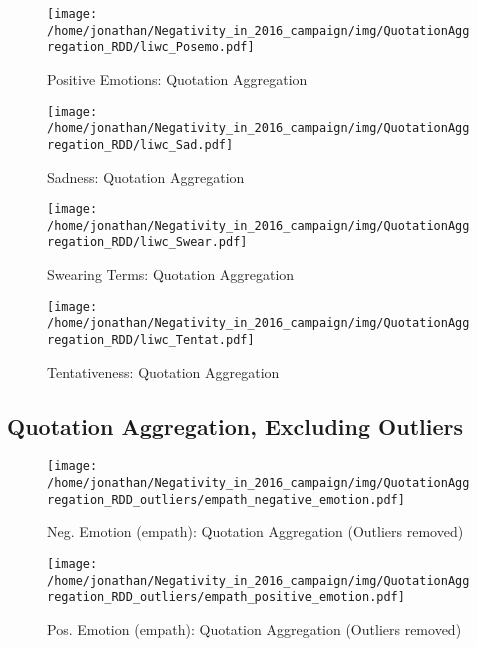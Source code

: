\begin{figure}[h]\centering
	\texttt{[image: /home/jonathan/Negativity\_in\_2016\_campaign/img/QuotationAggregation\_RDD/liwc\_Posemo.pdf]}
	\caption{Positive Emotions: Quotation Aggregation}
	\label{fig: qa_Positive Emotions}
\end{figure}

\begin{figure}[h]\centering
	\texttt{[image: /home/jonathan/Negativity\_in\_2016\_campaign/img/QuotationAggregation\_RDD/liwc\_Sad.pdf]}
	\caption{Sadness: Quotation Aggregation}
	\label{fig: qa_Sadness}
\end{figure}

\begin{figure}[h]\centering
	\texttt{[image: /home/jonathan/Negativity\_in\_2016\_campaign/img/QuotationAggregation\_RDD/liwc\_Swear.pdf]}
	\caption{Swearing Terms: Quotation Aggregation}
	\label{fig: qa_Swearing Terms}
\end{figure}

\begin{figure}[h]\centering
	\texttt{[image: /home/jonathan/Negativity\_in\_2016\_campaign/img/QuotationAggregation\_RDD/liwc\_Tentat.pdf]}
	\caption{Tentativeness: Quotation Aggregation}
	\label{fig: qa_Tentativeness}
\end{figure}

\clearpage
\pagebreak

\subsection{Quotation Aggregation, Excluding Outliers}

\begin{figure}[h]\centering
	\texttt{[image: /home/jonathan/Negativity\_in\_2016\_campaign/img/QuotationAggregation\_RDD\_outliers/empath\_negative\_emotion.pdf]}
	\caption{Neg. Emotion (empath): Quotation Aggregation (Outliers removed)}
	\label{fig: qa_Neg. Emotion (empath)}
\end{figure}

\begin{figure}[h]\centering
	\texttt{[image: /home/jonathan/Negativity\_in\_2016\_campaign/img/QuotationAggregation\_RDD\_outliers/empath\_positive\_emotion.pdf]}
	\caption{Pos. Emotion (empath): Quotation Aggregation (Outliers removed)}
	\label{fig: qa_Pos. Emotion (empath)}
\end{figure}


